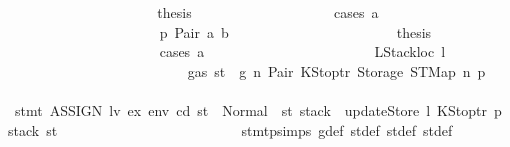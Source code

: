\begin{isabellebody}
\ \ \ \ \ \ \ \ \ \ \ \ \ \ \ \ \ \ \isamarkupfalse%
\ \isamarkupfalse%
\ {\isacharquery}{\kern0pt}thesis\isanewline
\ \ \ \ \ \ \ \ \ \ \ \ \ \ \ \ \ \ \isamarkupfalse%
\ {\isacharparenleft}{\kern0pt}cases\ a{\isacharparenright}{\kern0pt}\isanewline
\ \ \ \ \ \ \ \ \ \ \ \ \ \ \ \ \ \ \ \ \isamarkupfalse%
\ p{}{\isacharcolon}{\kern0pt}\ {\isacharparenleft}{\kern0pt}Pair\ a\ b{\isacharparenright}{\kern0pt}\isanewline
\ \ \ \ \ \ \ \ \ \ \ \ \ \ \ \ \ \ \ \ \isamarkupfalse%
\ \isamarkupfalse%
\ {\isacharquery}{\kern0pt}thesis\isanewline
\ \ \ \ \ \ \ \ \ \ \ \ \ \ \ \ \ \ \ \ \isamarkupfalse%
\ {\isacharparenleft}{\kern0pt}cases\ a{\isacharparenright}{\kern0pt}\isanewline
\ \ \ \ \ \ \ \ \ \ \ \ \ \ \ \ \ \ \ \ \ \ \isamarkupfalse%
\ {\isacharparenleft}{\kern0pt}LStackloc\ l{\isacharparenright}{\kern0pt}\isanewline
\ \ \ \ \ \ \ \ \ \ \ \ \ \ \ \ \ \ \ \ \ \ \isamarkupfalse%
\ {}{\isacharparenleft}{\kern0pt}{}{\isacharparenright}{\kern0pt}\ {\isacharbackquoteopen}{\isasymnot}\ gas\ st\ {\isasymle}\ g{\isacharbackquoteclose}\ n\ Pair\ KStoptr\ Storage\ STMap\ n{}\ p{}\isanewline
\ \ \ \ \ \ \ \ \ \ \ \ \ \ \ \ \ \ \ \ \ \ \isamarkupfalse%
\ {\isachardoublequoteopen}stmt\ {\isacharparenleft}{\kern0pt}ASSIGN\ lv\ ex{\isacharparenright}{\kern0pt}\ env\ cd\ st\ {\isacharequal}{\kern0pt}\ Normal\ {\isacharparenleft}{\kern0pt}{\isacharparenleft}{\kern0pt}{\isacharparenright}{\kern0pt}{\isacharcomma}{\kern0pt}\ st{\isacharprime}{\kern0pt}{\isacharprime}{\kern0pt}{\isacharprime}{\kern0pt}\ {\isasymlparr}stack\ {\isacharcolon}{\kern0pt}{\isacharequal}{\kern0pt}\ updateStore\ l\ {\isacharparenleft}{\kern0pt}KStoptr\ p{\isacharparenright}{\kern0pt}\ {\isacharparenleft}{\kern0pt}stack\ st{\isacharprime}{\kern0pt}{\isacharprime}{\kern0pt}{\isacharprime}{\kern0pt}{\isacharparenright}{\kern0pt}{\isasymrparr}{\isacharparenright}{\kern0pt}{\isachardoublequoteclose}\isanewline
\ \ \ \ \ \ \ \ \ \ \ \ \ \ \ \ \ \ \ \ \ \ \ \ \isamarkupfalse%
\ stmt{\isachardot}{\kern0pt}psimps{\isacharparenleft}{\kern0pt}{}{\isacharparenright}{\kern0pt}\ g{\isacharunderscore}{\kern0pt}def\ st{\isacharprime}{\kern0pt}{\isacharunderscore}{\kern0pt}def\ st{\isacharprime}{\kern0pt}{\isacharprime}{\kern0pt}{\isacharunderscore}{\kern0pt}def\ st{\isacharprime}{\kern0pt}{\isacharprime}{\kern0pt}{\isacharprime}{\kern0pt}{\isacharunderscore}{\kern0pt}def\ \isamarkupfalse%

\end{isabellebody}
